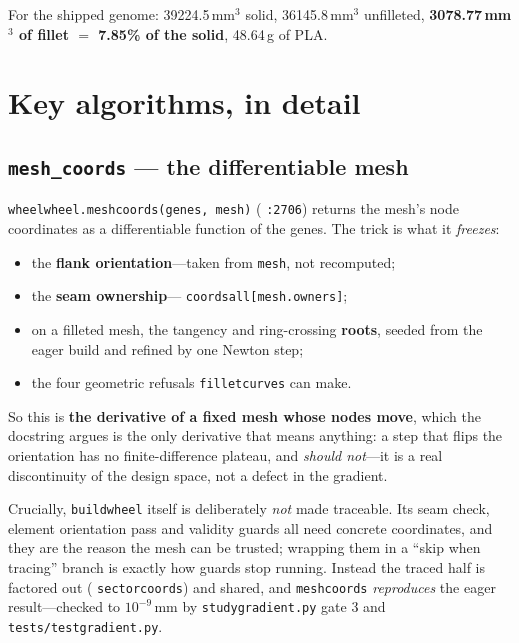 \documentclass[11pt,a4paper]{article}
\DeclareRobustCommand{\code}[1]{%
  \texttt{\small\def\_{\textunderscore\discretionary{}{}{}}#1}}
\begin{document}
For the shipped genome: 39224.5\,mm$^3$ solid, 36145.8\,mm$^3$ unfilleted,
\textbf{3078.77\,mm$^3$ of fillet $=$ 7.85\% of the solid}, 48.64\,g of PLA.

\section{Key algorithms, in detail}
\label{sec:algorithms}

\subsection{\texttt{mesh\_coords} --- the differentiable mesh}
\label{sec:meshcoords}

\code{wheel\_wheel.mesh\_coords(genes, mesh)} (\code{:2706}) returns the mesh's node
coordinates as a differentiable function of the genes. The trick is what it
\emph{freezes}:

\begin{itemize}
\item the \textbf{flank orientation}---taken from \code{mesh}, not recomputed;
\item the \textbf{seam ownership}---\code{coords\_all[mesh.owners]};
\item on a filleted mesh, the tangency and ring-crossing \textbf{roots}, seeded from
  the eager build and refined by one Newton step;
\item the four geometric refusals \code{\_fillet\_curves} can make.
\end{itemize}

So this is \textbf{the derivative of a fixed mesh whose nodes move}, which the docstring
argues is the only derivative that means anything: a step that flips the orientation has
no finite-difference plateau, and \emph{should not}---it is a real discontinuity of the
design space, not a defect in the gradient.

Crucially, \code{build\_wheel} itself is deliberately \emph{not} made traceable. Its
seam check, element orientation pass and validity guards all need concrete coordinates,
and they are the reason the mesh can be trusted; wrapping them in a ``skip when
tracing'' branch is exactly how guards stop running. Instead the traced half is factored
out (\code{\_sector\_coords}) and shared, and \code{mesh\_coords} \emph{reproduces} the
eager result---checked to $10^{-9}$\,mm by \code{study\_gradient.py} gate 3 and
\code{tests/test\_gradient.py}.
\end{document}
